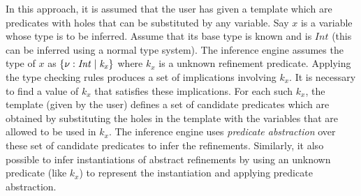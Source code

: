 In this approach, it is assumed that the user has given a template which are predicates
with holes that can be substituted by any variable. 
Say $x$ is a variable whose type is to be inferred. Assume that its base type 
is known and is $Int$ (this can be inferred using a normal type system).
The inference engine assumes the type of $x$ as $\mathit{\{ \nu: Int \; | \; k_x\}}$ where $k_x$ is a unknown refinement predicate. 
Applying the type checking rules produces a set of implications involving $k_x$.
It is necessary to find a value of $k_x$ that satisfies these implications.
For each such $k_x$, the template (given by the user) defines a set of candidate predicates which are obtained 
by substituting the holes in the template with the variables that are allowed to be used in $k_x$.
The inference engine uses \emph{predicate abstraction} over these set of candidate predicates to infer the refinements.
Similarly, it also possible to infer instantiations of abstract refinements by 
using an unknown predicate (like $k_x$) to represent the instantiation and applying predicate abstraction.

